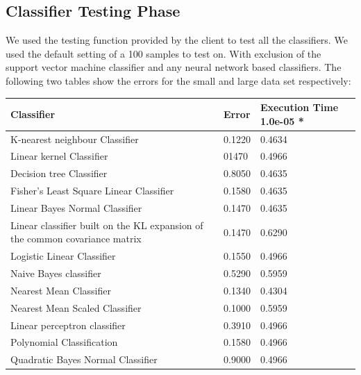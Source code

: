 \documentclass[%
        compressed,
        final,
        notitlepage,
        narroweqnarray,
        inline,
        twoside,
        ]{ieee}
\begin{document}
\subsection{Classifier Testing Phase}
We used the testing function provided by the client to test all the classifiers.
We used the default setting of a 100 samples to test on. With exclusion of the
support vector machine classifier and any neural network based classifiers. The
following two tables show the errors for the small and large data set
respectively:\\
\begin{table}
    \begin{tabular} {p{5cm}lp{1.5cm}} %
        \hline
    Classifier & Error & Execution Time 1.0e-05 * \\
        \hline
K-nearest neighbour Classifier                                              & 0.1220 & 0.4634 \\
Linear kernel Classifier                                                    & 01470  & 0.4966 \\
Decision tree Classifier                                                    & 0.8050 & 0.4635 \\
Fisher's Least Square Linear Classifier                                     & 0.1580 & 0.4635 \\
Linear Bayes Normal Classifier                                              & 0.1470 & 0.4635 \\
Linear classifier built on the KL expansion of the common covariance matrix & 0.1470 & 0.6290 \\
Logistic Linear Classifier                                                  & 0.1550 & 0.4966 \\
Naive Bayes classifier                                                      & 0.5290 & 0.5959 \\
Nearest Mean Classifier                                                     & 0.1340 & 0.4304 \\
Nearest Mean Scaled Classifier                                              & 0.1000 & 0.5959 \\
Linear perceptron classifier                                                & 0.3910 & 0.4966 \\
Polynomial Classification                                                   & 0.1580 & 0.4966 \\
Quadratic Bayes Normal Classifier                                           & 0.9000 & 0.4966 \\

\end{tabular}
\end{table}
\end{document}
